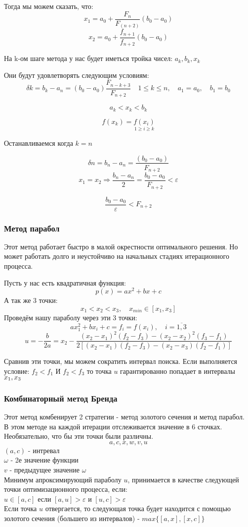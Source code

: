 \documentclass[fleqn]{article}
\begin{document}
Тогда мы можем сказать, что:\\

$$x_1=a_0+\frac{F_n}{F_(n+2)}(b_0-a_0)$$
$$x_2=a_0+\frac{f_{n+1}}{f_{n+2}}(b_0-a_0)$$

На k-ом шаге метода у нас будет иметься тройка чисел: $a_k, b_k, x_k$

Они будут удовлетворять следующим условиям:
$$\delta k = b_k - a_n = (b_0-a_0)\frac{F_{n-k+3}}{F_{n+2}} \quad 1 \leq k \leq n,\quad a_1 = a_0,\quad b_1=b_0$$

$$a_k < x_k < b_k$$

$$f(x_k)=\underset{1 \geq i \geq k}{f(x_i)}$$

Останавливаемся когда $k=n$

$$\delta n = b_n - a_n = \frac{(b_0-a_0)}{F_{n+2}}$$
$$x_1 = x_2 \Rightarrow \frac{b_n - a_n}{2} = \frac{b_0-a_0}{F_{n+2}}<\varepsilon$$

$$\frac{b_0-a_0}{\varepsilon}<F_{n+2}$$

\subsubsection*{Метод парабол}
Этот метод работает быстро в малой окрестности оптимального решения. Но может работать долго и неустойчиво на начальных стадиях итерационного процесса.

Пусть у нас есть квадратичная функция:
$$p(x)=ax^2+bx+c$$
А так же 3 точки:
$$x_1 < x_2 < x_3,\quad x_{min}\in[x_1,x_3]$$
Проведём нашу параболу через эти 3 точки:
$$ax^2_1+bx_i+c=f_i=f(x_i),\quad i=\overline{1,3}$$
$$u=-\frac{b}{2a}=x_2-\frac{(x_2-x_1)^2(f_2-f_3)-(x_2-x_2)^2(f_3-f_1)}{2[(x_2-x_1)(f_2-f_3)-(x_2-x_3)(f_2-f_1)]}$$

Сравнив эти точки, мы можем сократить интервал поиска. Если выполняется условие: $f_2<f_1$ И $f_2<f_3$ то точка $u$ гарантированно попадает в интервалы $x_1,\space x_3$

\subsubsection*{Комбинаторный метод Бренда}
Этот метод комбенирует 2 стратегии - метод золотого сечения и метод парабол.\\

В этом методе на каждой итерации отслеживается значение в 6 сточках. Необязательно, что бы эти точки были различны.
$$a, c, x, w, v, u$$
$(a,c)$ - интревал\\
$\omega$ - 2е значение функции\\
$v$ - предыдущее значение $\omega$\\

Минимум апроксимирующий параболу $u$, принимается в качестве следующей точки оптимизационного процесса, если:\\

$u\in[a,c]$ если $[a,u]>\varepsilon$ и $[u,c]>\varepsilon$\\

Если точка $u$ отвергается, то следующая точка будет находится с помощью золотого сечения (большего из интервалов) - $max\{[a,x],[x,c]\}$\\
\end{document}
